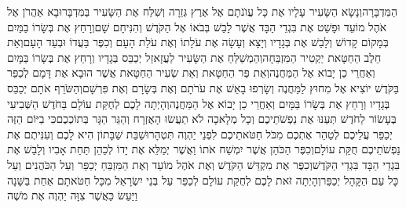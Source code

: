 \documentclass[../main/main.tex]{subfiles}
\begin{document}
\begin{multicols*}{\ncols}
הַמִּדְבָּרָה\PreVerseSpace{}וְנָשָׂא הַשָּׂעִיר עָלָיו אֶת כָּל עֲוֺנֹתָם אֶל אֶרֶץ גְּזֵרָה וְשִׁלַּח אֶת הַשָּׂעִיר בַּמִּדְבָּר\PreVerseSpace{}וּבָא אַהֲרֹן אֶל אֹהֶל מוֹעֵד וּפָשַׁט אֶת בִּגְדֵי הַבָּד אֲשֶׁר לָבַשׁ בְּבֹאוֹ אֶל הַקֹּדֶשׁ וְהִנִּיחָם שָׁם\PreVerseSpace{}וְרָחַץ אֶת בְּשָׂרוֹ בַמַּיִם בְּמָקוֹם קָדוֹשׁ וְלָבַשׁ אֶת בְּגָדָיו וְיָצָא וְעָשָׂה אֶת עֹלָתוֹ וְאֶת עֹלַת הָעָם וְכִפֶּר בַּעֲדוֹ וּבְעַד הָעָם\PreVerseSpace{}וְאֵת חֵלֶב הַחַטָּאת יַקְטִיר הַמִּזְבֵּחָה\PreVerseSpace{}וְהַמְשַׁלֵּחַ אֶת הַשָּׂעִיר לַעֲזָאזֵל יְכַבֵּס בְּגָדָיו וְרָחַץ אֶת בְּשָׂרוֹ בַּמָּיִם וְאַחֲרֵי כֵן יָבוֹא אֶל הַמַּחֲנֶה\PreVerseSpace{}וְאֵת פַּר הַחַטָּאת וְאֵת שְׂעִיר הַחַטָּאת אֲשֶׁר הוּבָא אֶת דָּמָם לְכַפֵּר בַּקֹּדֶשׁ יוֹצִיא אֶל מִחוּץ לַמַּחֲנֶה וְשָׂרְפוּ בָאֵשׁ אֶת עֹרֹתָם וְאֶת בְּשָׂרָם וְאֶת פִּרְשָׁם\PreVerseSpace{}וְהַשֹּׂרֵף אֹתָם יְכַבֵּס בְּגָדָיו וְרָחַץ אֶת בְּשָׂרוֹ בַּמָּיִם וְאַחֲרֵי כֵן יָבוֹא אֶל הַמַּחֲנֶה\PreVerseSpace{}וְהָיְתָה לָכֶם לְחֻקַּת עוֹלָם בַּחֹדֶשׁ הַשְּׁבִיעִי בֶּעָשׂוֹר לַחֹדֶשׁ תְּעַנּוּ אֶת נַפְשֹׁתֵיכֶם וְכָל מְלָאכָה לֹא תַעֲשׂוּ הָאֶזְרָח וְהַגֵּר הַגָּר בְּתוֹכְכֶם\PreVerseSpace{}כִּי בַיּוֹם הַזֶּה יְכַפֵּר עֲלֵיכֶם לְטַהֵר אֶתְכֶם מִכֹּל חַטֹּאתֵיכֶם לִפְנֵי יַהְוֶה תִּטְהָרוּ\PreVerseSpace{}שַׁבַּת שַׁבָּתוֹן הִיא לָכֶם וְעִנִּיתֶם אֶת נַפְשֹׁתֵיכֶם חֻקַּת עוֹלָם\PreVerseSpace{}וְכִפֶּר הַכֹּהֵן אֲשֶׁר יִמְשַׁח אֹתוֹ וַאֲשֶׁר יְמַלֵּא אֶת יָדוֹ לְכַהֵן תַּחַת אָבִיו וְלָבַשׁ אֶת בִּגְדֵי הַבָּד בִּגְדֵי הַקֹּדֶשׁ\PreVerseSpace{}וְכִפֶּר אֶת מִקְדַּשׁ הַקֹּדֶשׁ וְאֶת אֹהֶל מוֹעֵד וְאֶת הַמִּזְבֵּחַ יְכַפֵּר וְעַל הַכֹּהֲנִים וְעַל כָּל עַם הַקָּהָל יְכַפֵּר\PreVerseSpace{}וְהָיְתָה זֹּאת לָכֶם לְחֻקַּת עוֹלָם לְכַפֵּר עַל בְּנֵי יִשְׂרָאֵל מִכָּל חַטֹּאתָם אַחַת בַּשָּׁנָה וַיַּעַשׂ כַּאֲשֶׁר צִוָּה יַהְוֶה אֶת מֹשֶׁה\OpenSection{}\par

\end{multicols*}
\end{document}
